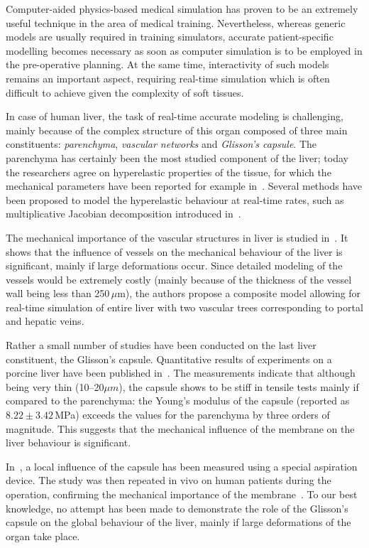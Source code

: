 \documentclass{llncs}
\begin{document}
Computer-aided physics-based medical simulation has proven to be an extremely useful technique in the area of medical training. 
Nevertheless, whereas generic models are usually required in training simulators, accurate patient-specific modelling
becomes necessary as soon as computer simulation is to be employed in the pre-operative planning. At the same time, 
interactivity of such models  remains an important aspect, requiring real-time simulation which is often difficult to 
achieve given the complexity of soft tissues. 

In case of human liver, the task of real-time accurate modeling is challenging, mainly because of the complex structure 
of this organ composed of three main constituents: \emph{parenchyma}, \emph{vascular networks} and \emph{Glisson's capsule}.
The parenchyma has certainly been the most studied component of the liver; today the researchers agree on hyperelastic 
properties of the tissue, for which the mechanical parameters have been reported for example in~\cite{Kerdok2006,Gao2009}. 
Several methods have been proposed to model the hyperelastic behaviour at real-time rates, such as multiplicative Jacobian decomposition
introduced in~\cite{Marchesseau2010}.

The mechanical importance of the vascular structures in liver is studied in~\cite{Peterlik2012}. It shows that the 
influence of vessels on the mechanical behaviour of the liver is significant, mainly if large deformations occur. 
Since detailed modeling of the vessels would be extremely costly (mainly because of the thickness of the vessel wall 
being less than 250\,{$\mu$}m), the authors propose a composite model allowing for real-time simulation of entire liver
with two vascular trees corresponding to portal and hepatic veins.

Rather a small number of studies have been conducted on the last liver constituent, the  Glisson's capsule.
Quantitative results of experiments on a porcine liver have been published in~\cite{Umale2013}. The measurements indicate that although being very 
thin (10--20$\mu m$), the capsule shows to be stiff in tensile tests mainly if compared to the parenchyma: the Young's modulus of the capsule (reported as $8.22\pm3.42$\,MPa) exceeds the values for the parenchyma by three orders of magnitude.
This suggests that the mechanical influence of the membrane on the liver behaviour is significant.

In~\cite{Hollenstein2006}, a local influence of the capsule has been measured using a special aspiration device. The study was then repeated 
in vivo on human patients during the operation, confirming the mechanical importance of the membrane~\cite{Ahn2010,Nava2008}.
To our best knowledge, no attempt has been made to demonstrate the role of the Glisson's capsule on the global behaviour of 
the liver, mainly if large deformations of the organ take place.
\end{document}
